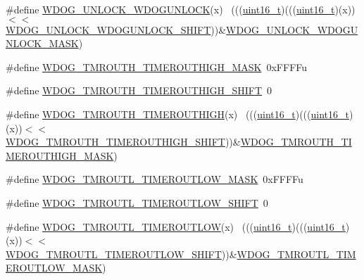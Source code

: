 \begin{DoxyCompactItemize}
\item 
\#define \hyperlink{group___w_d_o_g___register___masks_ga7fd9cc224e9c1b23f313f9bf419a5596}{W\+D\+O\+G\+\_\+\+U\+N\+L\+O\+C\+K\+\_\+\+W\+D\+O\+G\+U\+N\+L\+O\+CK}(x)                            ~(((\hyperlink{_p_e___types_8h_a1f1825b69244eb3ad2c7165ddc99c956}{uint16\+\_\+t})(((\hyperlink{_p_e___types_8h_a1f1825b69244eb3ad2c7165ddc99c956}{uint16\+\_\+t})(x))$<$$<$\hyperlink{group___w_d_o_g___register___masks_ga07ed92839744d67e4c393b00bc293246}{W\+D\+O\+G\+\_\+\+U\+N\+L\+O\+C\+K\+\_\+\+W\+D\+O\+G\+U\+N\+L\+O\+C\+K\+\_\+\+S\+H\+I\+FT}))\&\hyperlink{group___w_d_o_g___register___masks_gadcf9026f6f2730a765e504ec4c7126a8}{W\+D\+O\+G\+\_\+\+U\+N\+L\+O\+C\+K\+\_\+\+W\+D\+O\+G\+U\+N\+L\+O\+C\+K\+\_\+\+M\+A\+SK})
\item 
\#define \hyperlink{group___w_d_o_g___register___masks_ga4c46affdc0cd5ed2cde734812f783d31}{W\+D\+O\+G\+\_\+\+T\+M\+R\+O\+U\+T\+H\+\_\+\+T\+I\+M\+E\+R\+O\+U\+T\+H\+I\+G\+H\+\_\+\+M\+A\+SK}~0x\+F\+F\+F\+Fu
\item 
\#define \hyperlink{group___w_d_o_g___register___masks_ga6565e44e33822cee4835856bfb88431e}{W\+D\+O\+G\+\_\+\+T\+M\+R\+O\+U\+T\+H\+\_\+\+T\+I\+M\+E\+R\+O\+U\+T\+H\+I\+G\+H\+\_\+\+S\+H\+I\+FT}~0
\item 
\#define \hyperlink{group___w_d_o_g___register___masks_gaa16e394f0074dc397d10388758afab4d}{W\+D\+O\+G\+\_\+\+T\+M\+R\+O\+U\+T\+H\+\_\+\+T\+I\+M\+E\+R\+O\+U\+T\+H\+I\+GH}(x)                      ~(((\hyperlink{_p_e___types_8h_a1f1825b69244eb3ad2c7165ddc99c956}{uint16\+\_\+t})(((\hyperlink{_p_e___types_8h_a1f1825b69244eb3ad2c7165ddc99c956}{uint16\+\_\+t})(x))$<$$<$\hyperlink{group___w_d_o_g___register___masks_ga6565e44e33822cee4835856bfb88431e}{W\+D\+O\+G\+\_\+\+T\+M\+R\+O\+U\+T\+H\+\_\+\+T\+I\+M\+E\+R\+O\+U\+T\+H\+I\+G\+H\+\_\+\+S\+H\+I\+FT}))\&\hyperlink{group___w_d_o_g___register___masks_ga4c46affdc0cd5ed2cde734812f783d31}{W\+D\+O\+G\+\_\+\+T\+M\+R\+O\+U\+T\+H\+\_\+\+T\+I\+M\+E\+R\+O\+U\+T\+H\+I\+G\+H\+\_\+\+M\+A\+SK})
\item 
\#define \hyperlink{group___w_d_o_g___register___masks_gaf33faad844e2af36af7af5c6bf49a361}{W\+D\+O\+G\+\_\+\+T\+M\+R\+O\+U\+T\+L\+\_\+\+T\+I\+M\+E\+R\+O\+U\+T\+L\+O\+W\+\_\+\+M\+A\+SK}~0x\+F\+F\+F\+Fu
\item 
\#define \hyperlink{group___w_d_o_g___register___masks_gae4a9f52d3b15e28932d287dee4128e8a}{W\+D\+O\+G\+\_\+\+T\+M\+R\+O\+U\+T\+L\+\_\+\+T\+I\+M\+E\+R\+O\+U\+T\+L\+O\+W\+\_\+\+S\+H\+I\+FT}~0
\item 
\#define \hyperlink{group___w_d_o_g___register___masks_gaf446de0ba58d96e3acffed206a3f6b65}{W\+D\+O\+G\+\_\+\+T\+M\+R\+O\+U\+T\+L\+\_\+\+T\+I\+M\+E\+R\+O\+U\+T\+L\+OW}(x)                        ~(((\hyperlink{_p_e___types_8h_a1f1825b69244eb3ad2c7165ddc99c956}{uint16\+\_\+t})(((\hyperlink{_p_e___types_8h_a1f1825b69244eb3ad2c7165ddc99c956}{uint16\+\_\+t})(x))$<$$<$\hyperlink{group___w_d_o_g___register___masks_gae4a9f52d3b15e28932d287dee4128e8a}{W\+D\+O\+G\+\_\+\+T\+M\+R\+O\+U\+T\+L\+\_\+\+T\+I\+M\+E\+R\+O\+U\+T\+L\+O\+W\+\_\+\+S\+H\+I\+FT}))\&\hyperlink{group___w_d_o_g___register___masks_gaf33faad844e2af36af7af5c6bf49a361}{W\+D\+O\+G\+\_\+\+T\+M\+R\+O\+U\+T\+L\+\_\+\+T\+I\+M\+E\+R\+O\+U\+T\+L\+O\+W\+\_\+\+M\+A\+SK})
$$
\end{DoxyCompactItemize}

